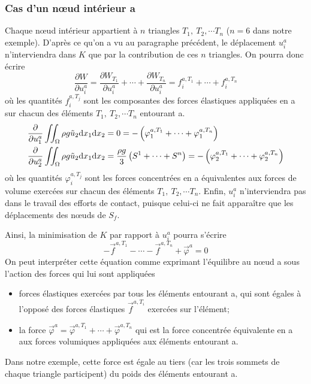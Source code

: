 \subsubsection{Cas d'un nœud intérieur a}
Chaque nœud intérieur appartient à $n$ triangles $T_1,\ T_2, \cdots T_n$ ($n=6$ dans notre exemple).
D'après ce qu'on a vu au paragraphe précédent, le déplacement $u_i^ a$ n'interviendra dans $K$ que par la contribution de ces $n$ triangles.
On pourra donc écrire 
\begin{equation}
    \frac{\partial W}{\partial u_i^a} = \frac{\partial W_{T_1}}{\partial u_i^a} + \cdots + \frac{\partial W_{T_n}}{\partial u_i^a} = f_i^{a,T_1} + \cdots + f_i^{a, T_n}
    \label{eq:Ch09-087}
\end{equation}
où les quantités $f_i^{a,T_j}$ sont les composantes des forces élastiques appliquées en a sur chacun des éléments  $T_1,\ T_2, \cdots T_n$ entourant a.
\begin{equation}
    \begin{aligned}
        \frac{\partial }{\partial u_1^a} \iint_{\Omega} \rho g \tilde{u}_2 \mathrm{d} x_1 \mathrm{d} x_2 &= 0 = - \left( \varphi_1^{a,T_1} + \cdots + \varphi_1^{a,T_n} \right) \\
        \frac{\partial }{\partial u_2^a} \iint_{\Omega} \rho g \tilde{u}_2 \mathrm{d} x_1 \mathrm{d} x_2 &= \frac{\rho g}{3} \left( S^1 + \cdots + S^n \right) = - \left( \varphi_2^{a,T_1} + \cdots + \varphi_2^{a,T_n} \right)
    \end{aligned}
    \label{eq:Ch09-088}
\end{equation}
où les quantités $\varphi_i^{a,T_j}$ sont les forces concentrées en a équivalentes aux forces de volume exercées sur chacun des éléments $T_1,\ T_2, \cdots T_n$.
Enfin, $u_i^a$ n'interviendra pas dans le travail des efforts de contact, puisque celui-ci ne fait apparaître que les déplacements des nœuds de $S_f$.

Ainsi, la minimisation de $K$ par rapport à $u_i^a$ pourra s'écrire
\begin{equation}
    -\vec{f}^{a,T_1} - \cdots - \vec{f}^{a,T_n} + \vec{\varphi}^a = 0
    \label{eq:Ch09-089}
\end{equation}
On peut interpréter cette équation comme exprimant l'équilibre au nœud a sous l'action des forces qui lui sont appliquées
\begin{itemize}
    \item forces élastiques exercées par tous les éléments entourant a, qui sont égales à l'opposé des forces élastiques $\vec{f}^{a,T_i}$ exercées sur l'élément;
    \item la force $\vec{\varphi}^a = \vec{\varphi}^{a,T_1} + \cdots + \vec{\varphi}^{a,T_n}$ qui est la force concentrée équivalente en a aux forces volumiques appliquées aux éléments entourant a.
\end{itemize}
Dans notre exemple, cette force est égale au tiers (car les trois sommets de chaque triangle participent) du poids des éléments entourant a. 

